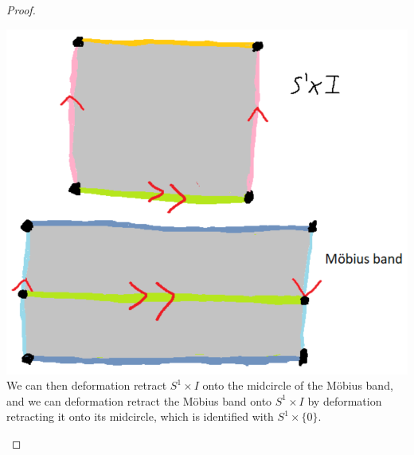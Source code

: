 \documentclass{article}
\begin{document}
\begin{proof}
\begin{enumerate}
\includegraphics[scale=0.5]{Screenshot (1366).png}\newline We can then deformation retract $S^1\times I$ onto the midcircle of the M\"obius band, and we can deformation retract the M\"obius band onto $S^1\times I$ by deformation retracting it onto its midcircle, which is identified with $S^1\times\{0\}$.
\end{enumerate}
\end{proof}
\end{document}
